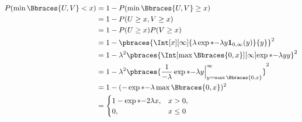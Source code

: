 \begin{solution}
\begin{enumerate}
    \begin{align*}
        P(\min \Bbraces{U, V} < x)
        & =
        1 - P(\min \Bbraces{U, V} \geq x) \\
        & =
        1 - P(U \geq x, V \geq x) \\
        & =
        1 - P(U \geq x) P(V \geq x) \\
        & =
        1 - \pbraces{\Int[x][\infty]{\lambda \exp*{-\lambda y} \mathbf 1_{0, \infty}(y)}{y}}^2 \\
        & =
        1 - \lambda^2 \pbraces{\Int[\max \Bbraces{0, x}][\infty]{\exp*{-\lambda y}}{y}}^2 \\
        & =
        1 - \lambda^2 \pbraces{\frac{1}{-\lambda} \exp*{-\lambda y} \Big |_{y = \max \Bbraces{0, x}}^\infty}^2 \\
        & =
        1 - (-\exp*{-\lambda \max \Bbraces{0, x}})^2 \\
        & =
        \begin{cases}
            1 - \exp*{-2 \lambda x},
            & x > 0, \\
            0,
            & x \leq 0
        \end{cases}
    \end{align*}

\end{enumerate}



\end{solution}


